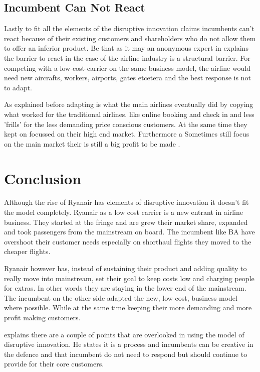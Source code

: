 \documentclass[a4paper, 11pt]{article}
\begin{document}
\subsection{Incumbent Can Not React}
\label{reaction}

Lastly to fit all the elements of the disruptive innovation \cite{Christensen97} claims incumbents can't react because of their existing customers and shareholders who do not allow them to offer an inferior product.
Be that as it may an anonymous expert in \cite{King} explains the barrier to react in the case of the airline industry is a structural barrier. For competing with a low-cost-carrier on the same business model, the airline would need new aircrafts, workers, airports, gates etcetera and the best response is not to adapt.

As explained before adapting is what the main airlines eventually did by copying what worked for the traditional airlines. like online booking and check in and less 'frills' for the less demanding price conscious customers. At the same time they kept on focussed on their high end market. Furthermore a  Sometimes still focus on the main market their is still a big profit to be made \cite{Christensen2015}.


\section{Conclusion}

Although the rise of Ryanair has elements of disruptive innovation it doesn't fit the model completely. Ryanair as a low cost carrier is a new entrant in airline business. They started at the fringe and are grew their market share, expanded and took passengers from the mainstream on board. The incumbent like BA have overshoot their customer needs especially on shorthaul flights they moved to the cheaper flights.

Ryanair however has, instead of sustaining their product and adding quality to really move into mainstream, set their goal to keep costs low and charging people for extras. In other words they are staying in the lower end of the mainstream. The incumbent on the other side adapted the new, low cost, business model where possible. While at the same time keeping their more demanding and more profit making customers.

\cite{Christensen2015} explains there are a couple of points that are overlooked in using the model of disruptive innovation. He states it is a process and incumbents can be creative in the defence and that incumbent do not need to respond but should continue to provide for their core customers.
\end{document}
